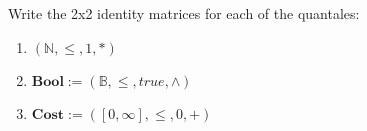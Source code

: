 
Write the 2x2 identity matrices for each of the quantales:
    \begin{enumerate}
      \item $(\mathbb{N},\leq,1,*)$
      \item $\mathbf{Bool}:=(\mathbb{B},\leq,true,\land)$
      \item $\mathbf{Cost}:=([0,\infty],\leq,0,+)$
    \end{enumerate}